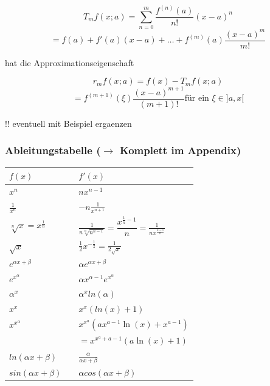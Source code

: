 \documentclass[6pt]{article}
\begin{document}
\begin{multicols*}{3}
					\[ T_mf(x;a) = \sum_{n=0}^m \frac{f^{(n)}(a)}{n!}(x-a)^n \] 
					\[= f(a) + f'(a)(x-a) + \ldots + f^{(m)}(a) \frac{(x-a)^m}{m!}	\]
					
					hat die Approximationseigenschaft
					
					\[ r_mf(x;a) = f(x) - T_mf(x;a)\]   
					\[ = f^{(m+1)}(\xi) \frac{(x-a)^{m+1}}{(m+1)!} \text{f{\"u}r ein }\xi \in ]a,x[\] 

				!! eventuell mit Beispiel ergaenzen
				
		\subsubsection*{Ableitungstabelle ($\rightarrow$ Komplett im Appendix)}
		\begin{onehalfspace}
			\begin{tabular}{ l | l l }
					$ f(x)$	\hspace{15mm}	& 	\hspace{1mm} &  $f'(x)$ \\ \hline
					$x^n$												&&	$nx^{n-1}$																							\\
					$\frac{1}{x^n}$									&&	$-n \frac{1}{x^{n+1}}$																			\\
					$\sqrt[n] x = x^{\frac{1}{n}}$			&&			$\frac{1}{n \sqrt[n]{n^{n-1}}} = \dfrac{x^{\frac{1}{n}-1}}{n} = 
																					\frac{1}{n {x}^{\frac{n-1}{n}}} $ 																\\
					$\sqrt {x}$										&&			$\frac{1}{2} x^{-\frac{1}{2}} =  \frac{1}{2 \sqrt{x}}$ 						\\
					$e^{\alpha x + \beta}$						&&		$\alpha e^{\alpha x + \beta}$ 															\\
					$e^{x^\alpha}$									&&		$\alpha x^{\alpha -1}  e^{x^\alpha}$ 												\\
					$\alpha^x$										&&		$\alpha^x ln(\alpha)$ 																		\\
					$x^x$												&&		$x^x (ln(x) + 1)$ 																				\\
					$x^{x^\alpha}$									&&		$x^{x^a}\left(ax^{a-1}\ln\left(x\right)+x^{a-1}\right) 	$					\\
																			&&		$= x^{x^a+a-1}\left(a\ln\left(x\right)+1\right)$ 							\\
					$ln(\alpha x + \beta)$						&&		$\frac{\alpha}{\alpha x + \beta}$ 													\\	
					$sin(\alpha x + \beta)$					&&		$\alpha cos(\alpha x + \beta)$ 														\\

\end{tabular}
\end{onehalfspace}
\end{multicols*}
\end{document}

